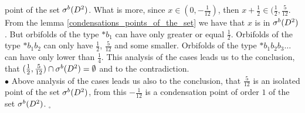 point of the set ${\mathcal{\sigma}^b(D^2)}$. What is more, since $x\in (0, -\frac{1}{12})$, then $x+\frac{1}{2} 
\in (\frac{1}{2}, \frac{5}{12}$. From the lemma \ref{condensations_points_of_the_set} we 
have that $x$ is in ${\mathcal{\sigma}^b(D^2)}$. But orbifolds of the type $*b_1$ can have \Eoc only greater or 
equal $\frac{1}{2}$. Orbifolds of the type $*b_1b_2$ can only have \Eoc $\frac{1}{2}$, 
$\frac{5}{12}$ and some smaller. Orbifolds of the type $*b_1b_2b_3\dots$ can have \Eoc only 
lower than $\frac{1}{4}$. This analysis of the cases leads us to the conclusion, that 
$(\frac{1}{2},\frac{5}{12})\cap {\mathcal{\sigma}^b(D^2)}=\emptyset$ and to the contradiction. \\
$\bullet$ Above analysis of the cases leads us also to the conclusion, that $\frac{5}{12}$ 
is 
an isolated point of the set ${\mathcal{\sigma}^b(D^2)}$, from this $-\frac{1}{12}$ is a condensation point 
of order $1$ of the set ${\mathcal{\sigma}^b(D^2)}$. $_\square$




 
 








